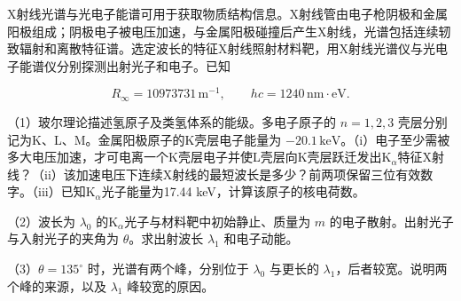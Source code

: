 \documentclass[12pt,a4paper,fontset=fandol]{ctexart}
\begin{document}
X射线光谱与光电子能谱可用于获取物质结构信息。X射线管由电子枪阴极和金属阳极组成；阴极电子被电压加速，与金属阳极碰撞后产生X射线，光谱包括连续轫致辐射和离散特征谱。选定波长的特征X射线照射材料靶，用X射线光谱仪与光电子能谱仪分别探测出射光子和电子。已知

\[R_\infty=10973731\,\mathrm{m^{-1}},\qquad
hc=1240\,\mathrm{nm\cdot eV}.\]

\begin{center}
\begin{minipage}{\linewidth}
\centering\begingroup{}
\ifdim\wd\diagrambox>.88\linewidth
\sbox{\diagrambox}{\resizebox{.88\linewidth}{!}{\usebox{\diagrambox}}}\fi
\ifdim\ht\diagrambox>.38\textheight
\resizebox{!}{.38\textheight}{\usebox{\diagrambox}}
\else\usebox{\diagrambox}\fi
\par{}\endgroup\end{minipage}\end{center}

（1）玻尔理论描述氢原子及类氢体系的能级。多电子原子的 \(n=1,2,3\)
壳层分别记为K、L、M。金属阳极原子的K壳层电子能量为
\(-20.1\,\mathrm{keV}\)。（i）电子至少需被多大电压加速，才可电离一个K壳层电子并使L壳层向K壳层跃迁发出K\(_\alpha\)特征X射线？（ii）该加速电压下连续X射线的最短波长是多少？前两项保留三位有效数字。（iii）已知K\(_\alpha\)光子能量为17.44
keV，计算该原子的核电荷数。

（2）波长为 \(\lambda_0\) 的K\(_\alpha\)光子与材料靶中初始静止、质量为
\(m\) 的电子散射。出射光子与入射光子的夹角为 \(\theta\)。求出射波长
\(\lambda_1\) 和电子动能。

（3）\(\theta=135^\circ\) 时，光谱有两个峰，分别位于 \(\lambda_0\)
与更长的 \(\lambda_1\)，后者较宽。说明两个峰的来源，以及 \(\lambda_1\)
峰较宽的原因。
\end{document}

